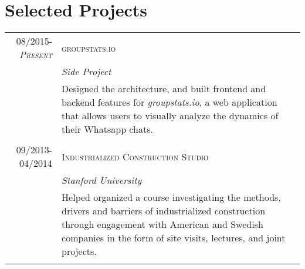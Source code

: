 \documentclass[a4paper,10pt]{article}
\begin{document}
\section{Selected Projects}
\begin{tabularx}{\textwidth}{r|X}

\textsc{08/2015-\emph{Present}} &  \textsc{groupstats.io}\\&\emph{Side Project}\\&\footnotesize{Designed the architecture, and built frontend and backend features for  \emph{groupstats.io}, a web application that allows users to visually analyze the dynamics of their Whatsapp chats.}\\\multicolumn{2}{c}{} \\


\textsc{09/2013-04/2014} &  \textsc{Industrialized Construction Studio}\\&\emph{Stanford University}\\&\footnotesize{Helped organized a course investigating the methods, drivers and barriers of industrialized construction through engagement with American and Swedish companies in the form of site visits, lectures, and joint projects.}\\\multicolumn{2}{c}{} \\




\end{tabularx}
\end{document}
